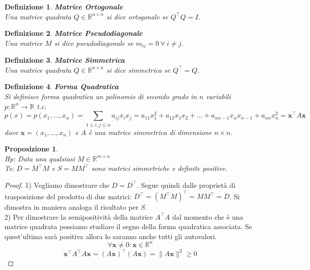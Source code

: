 \documentclass[11pt]{article}
\newtheorem{proposition}{Proposizione}
\newtheorem{definition}{Definizione}
\newcommand{\R}{\mathbb{R}} %
\begin{document}
\begin{definition}
    \textbf{Matrice Ortogonale}\\ Una matrice quadrata $Q\in\mathbb{R}^{n \times n}$ si dice ortogonale se $Q^\top      Q=I$.
\end{definition}
\begin{definition}
	\textbf{Matrice Pseudodiagonale}\\ Una matrice $M$ si dice pseudodiagonale se $m_{ij}=0 \ \forall \ i\neq j$.
\end{definition}
\begin{definition}
    \textbf{Matrice Simmetrica}\\ Una matrice quadrata $Q\in\mathbb{R}^{n \times n}$ si dice simmetrica se $Q^\top      =Q$.
\end{definition}
\begin{definition}
    \textbf{Forma Quadratica}\\ Si definisce forma quadratica un polinomio di secondo grado in $n$ variabili $p: \mathbb{R}^n \rightarrow \mathbb{R}$ t.c.
    \[
    p(x)=p(x_1,\dots,x_n)=\sum_{1 \leq i,j \leq n}a_{ij}x_ix_j=a_{11}x_1^2+a_{12}x_1x_2 + \dots + a_{nn-1}x_nx_{n-1}+a_{nn}x_n^2=\mathbf{x}^\top      A\mathbf{x}
    \]
    dove $\mathbf{x} = (x_1, \dots, x_n)$ e $A$ è una matrice simmetrica di dimensione $n \times n$.
\end{definition}
\begin{proposition}\label{prop 1}
\textbf{}\\
\textit{Hp:} Data una qualsiasi $M\in\mathbb{R}^{m \times n}$\\
\textit{Ts:} $D=M^\top      M$ e $S=MM^\top      $ sono  matrici simmetriche e definite positive.
\end{proposition}
\begin{proof}
1) Vogliamo dimostrare che $D=D^\top      $. Segue quindi dalle proprietà di trasposizione del prodotto di due matrici: $D^\top      =(M^\top      M)^\top      =MM^\top      =D$. Si dimostra in maniera analoga il risultato per $S$.\\
2) Per dimostrare la semipositività della matrice $A^\top      A$ dal momento che è una matrice quadrata possiamo studiare il segno della forma quadratica associata. Se quest'ultima sarà positiva allora lo saranno anche tutti gli autovalori.\\
$$ \forall \mathbf{x}\neq 0: \mathbf{x} \in \R^n$$ $$\mathbf{x}^\top      A^\top      A\mathbf{x}=(A\mathbf{x})^\top      (A\mathbf{x})= \|A\mathbf{x}\|^2\geq 0$$
\end{proof}
\end{document}
